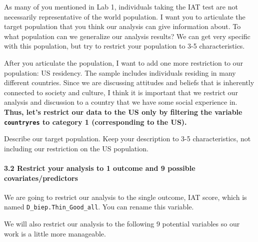 \documentclass[
  letterpaper,
  DIV=11,
  numbers=noendperiod]{scrartcl}
\let\oldparagraph\paragraph
\renewcommand{\paragraph}[1]{\oldparagraph{#1}\mbox{}}
\begin{document}
As many of you mentioned in Lab 1, individuals taking the IAT test are
not necessarily representative of the world population. I want you to
articulate the target population that you think our analysis can give
information about. To what population can we generalize our analysis
results? We can get very specific with this population, but try to
restrict your population to 3-5 characteristics.

After you articulate the population, I want to add one more restriction
to our population: US residency. The sample includes individuals
residing in many different countries. Since we are discussing attitudes
and beliefs that is inherently connected to society and culture, I think
it is important that we restrict our analysis and discussion to a
country that we have some social experience in. \textbf{Thus, let's
restrict our data to the US only by filtering the variable
\texttt{countryres} to category 1 (corresponding to the US).}

\begin{tcolorbox}[enhanced jigsaw, colframe=quarto-callout-important-color-frame, arc=.35mm, colbacktitle=quarto-callout-important-color!10!white, bottomrule=.15mm, left=2mm, breakable, opacitybacktitle=0.6, rightrule=.15mm, opacityback=0, bottomtitle=1mm, coltitle=black, leftrule=.75mm, toptitle=1mm, titlerule=0mm, title=\textcolor{quarto-callout-important-color}{\faExclamation}\hspace{0.5em}{Task}, toprule=.15mm, colback=white]

Describe our target population. Keep your description to 3-5
characteristics, not including our restriction on the US population.

\end{tcolorbox}

\hypertarget{restrict-your-analysis-to-1-outcome-and-9-possible-covariatespredictors}{%
\paragraph{3.2 Restrict your analysis to 1 outcome and 9 possible
covariates/predictors}\label{restrict-your-analysis-to-1-outcome-and-9-possible-covariatespredictors}}

We are going to restrict our analysis to the single outcome, IAT score,
which is named \texttt{D\_biep.Thin\_Good\_all}. You can rename this
variable.

We will also restrict our analysis to the following 9 potential
variables so our work is a little more manageable.
\end{document}
